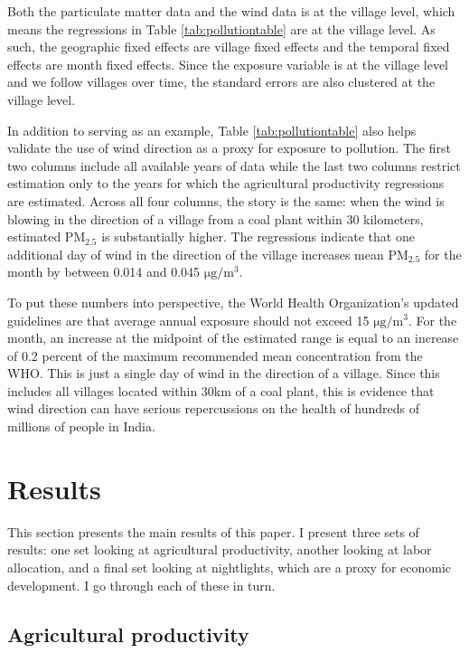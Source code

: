 \documentclass[
]{article}
\begin{document}
Both the particulate matter data and the wind data is at the village level, which means the regressions in Table \ref{tab:pollutiontable} are at the village level. As such, the geographic fixed effects are village fixed effects and the temporal fixed effects are month fixed effects. Since the exposure variable is at the village level and we follow villages over time, the standard errors are also clustered at the village level.

In addition to serving as an example, Table \ref{tab:pollutiontable} also helps validate the use of wind direction as a proxy for exposure to pollution. The first two columns include all available years of data while the last two columns restrict estimation only to the years for which the agricultural productivity regressions are estimated. Across all four columns, the story is the same: when the wind is blowing in the direction of a village from a coal plant within 30 kilometers, estimated \(\mathrm{PM_{2.5}}\) is substantially higher. The regressions indicate that one additional day of wind in the direction of the village increases mean \(\mathrm{PM_{2.5}}\) for the month by between 0.014 and 0.045 \(\mathrm{\mu g/m^3}\).

To put these numbers into perspective, the World Health Organization's updated guidelines are that average annual exposure should not exceed 15 \(\mathrm{\mu g/m^3}\). For the month, an increase at the midpoint of the estimated range is equal to an increase of 0.2 percent of the maximum recommended mean concentration from the WHO. This is just a single day of wind in the direction of a village. Since this includes all villages located within 30km of a coal plant, this is evidence that wind direction can have serious repercussions on the health of hundreds of millions of people in India.

\hypertarget{results}{%
\section{Results}\label{results}}

This section presents the main results of this paper. I present three sets of results: one set looking at agricultural productivity, another looking at labor allocation, and a final set looking at nightlights, which are a proxy for economic development. I go through each of these in turn.

\hypertarget{agricultural-productivity}{%
\subsection{Agricultural productivity}\label{agricultural-productivity}}
\end{document}
